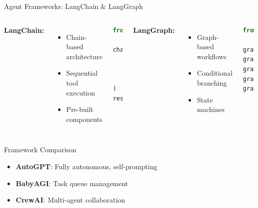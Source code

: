 \documentclass[aspectratio=169]{beamer}
\begin{document}
\begin{frame}[fragile]{Agent Frameworks: LangChain \& LangGraph}
	\begin{columns}
		\textbf{LangChain:}
		\begin{itemize}
			\item {\color{highlight}Chain-based} architecture
			\item Sequential tool execution
			\item Pre-built components
		\end{itemize}
		\begin{lstlisting}[language=python, basicstyle=\tiny]
from langchain import LLMChain

chain = LLMChain(
    llm=ChatOpenAI(),
    tools=[search, calculator],
    memory=ConversationMemory()
)
result = chain.run(query)
		\end{lstlisting}
		
		\textbf{LangGraph:}
		\begin{itemize}
			\item {\color{highlight}Graph-based} workflows
			\item Conditional branching
			\item State machines
		\end{itemize}
		\begin{lstlisting}[language=python, basicstyle=\tiny]
from langgraph import StateGraph

graph = StateGraph()
graph.add_node("plan", planner)
graph.add_node("execute", executor)
graph.add_edge("plan", "execute")
graph.compile()
		\end{lstlisting}
	\end{columns}
	
	\vspace{0.3cm}
	\begin{block}{Framework Comparison}
		\small
		\begin{itemize}
			\item \textbf{AutoGPT}: Fully autonomous, self-prompting
			\item \textbf{BabyAGI}: Task queue management
			\item \textbf{CrewAI}: Multi-agent collaboration
		\end{itemize}
	\end{block}
\end{frame}

\end{document}
